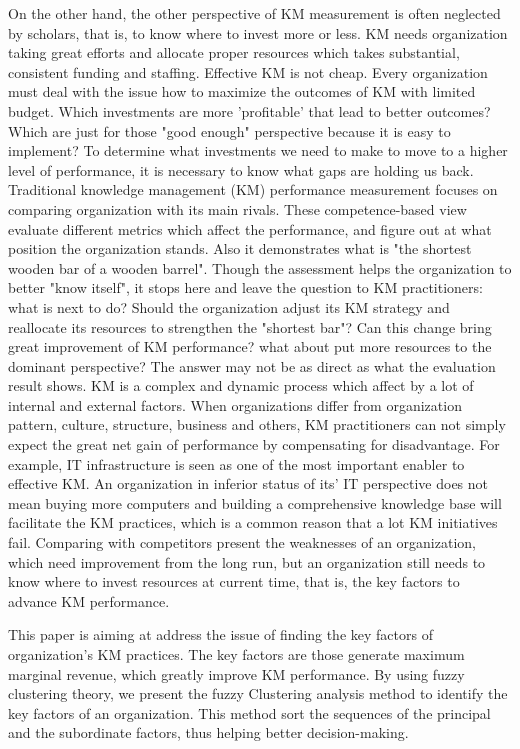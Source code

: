 \documentclass{elsarticle}
\begin{document}
 On the other hand, the other
 perspective of KM measurement is often neglected by scholars, that
 is, to know where to invest more or less.  KM needs organization
 taking great efforts and allocate proper resources which  takes substantial, consistent funding and staffing. Effective KM is
 not cheap. Every organization must deal with the issue how to
 maximize the outcomes of KM with limited budget.  Which 
 investments are more 'profitable' that lead to better outcomes?
 Which are just for those "good enough" perspective  because  it is
 easy to implement? To determine what investments we need to make to
 move to a higher level of performance, it is necessary to know what
 gaps are holding us back. Traditional knowledge management (KM)
 performance measurement focuses on comparing
 organization with its main rivals. These competence-based view
 evaluate different metrics which affect the performance, and figure
 out at what position the organization stands. Also it demonstrates
 what is "the shortest wooden bar of a wooden barrel". Though the
 assessment helps the organization to better "know itself", it stops
 here and leave the question to KM  practitioners: what is next to do?
 Should the organization adjust its KM strategy and reallocate its
 resources to strengthen the "shortest bar"? Can this change bring
 great improvement of KM performance? what about put more resources to
 the dominant perspective? The answer may not be as direct as what the
 evaluation result shows. KM is a complex and dynamic process which
 affect by a lot of internal and external factors. When organizations
 differ from organization pattern, culture, structure, business and
 others, KM practitioners can not simply expect the great net gain of
 performance  by compensating for disadvantage. For example, IT
 infrastructure is seen as one of the most important enabler to
 effective KM. An organization in inferior status of its' IT
 perspective does not mean buying more computers and building a
 comprehensive knowledge base will facilitate the KM practices, which
 is a common reason that a lot KM initiatives fail. Comparing with
 competitors present the weaknesses of an organization, which need
 improvement from the long run, but an organization still needs to
 know where to invest resources at current time, that is, the key
 factors to advance KM performance.

This paper is aiming at address the issue of finding the key factors
of organization's KM practices. The key factors are those generate
maximum marginal revenue, which greatly improve KM performance. By
using fuzzy clustering theory, we present the fuzzy Clustering analysis method to identify the key
factors of an organization.  This method sort the sequences of the principal and
the subordinate factors, thus helping better decision-making.
\end{document}
